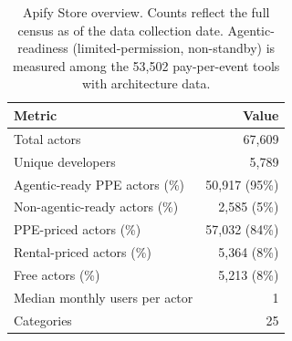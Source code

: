 \begin{table}[t]
  \centering
  \caption{Apify Store overview. Counts reflect the full census as of the data
    collection date. Agentic-readiness (limited-permission, non-standby) is
    measured among the 53{,}502 pay-per-event tools with architecture data.}
  \label{tab:overview}
  \small
  \begin{tabular}{l r}
    \toprule
    \textbf{Metric} & \textbf{Value} \\
    \midrule
    Total actors              & 67,609 \\
    Unique developers         & 5,789 \\
    Agentic-ready PPE actors (\%)  & 50,917 (95\%) \\
    Non-agentic-ready actors (\%) & 2,585 (5\%) \\
    PPE-priced actors (\%)     & 57,032 (84\%) \\
    Rental-priced actors (\%)  & 5,364 (8\%) \\
    Free actors (\%)           & 5,213 (8\%) \\
    Median monthly users per actor & 1 \\
    Categories                 & 25 \\
    \bottomrule
  \end{tabular}
\end{table}